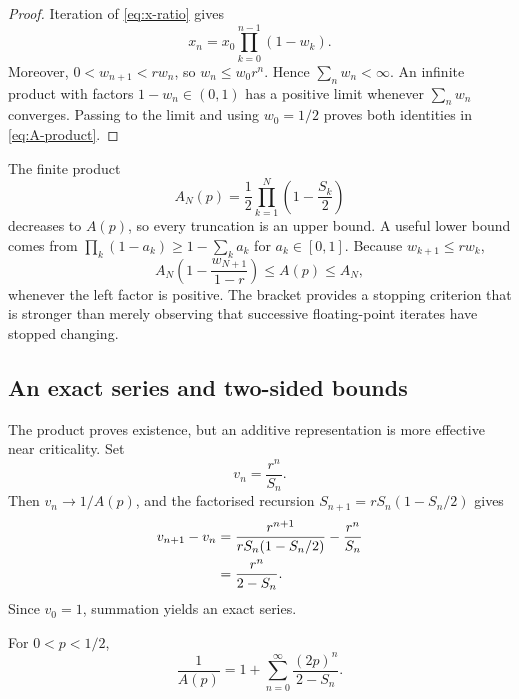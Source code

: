 \begin{proof}
Iteration of \cref{eq:x-ratio} gives
\begin{equation}
  x_n=x_0\prod_{k=0}^{n-1}(1-w_k).
\end{equation}
Moreover, \(0<w_{n+1}<rw_n\), so \(w_n\leq w_0r^n\).  Hence
\(\sum_nw_n<\infty\).  An infinite product with factors \(1-w_n\in(0,1)\) has a
positive limit whenever \(\sum_nw_n\) converges.  Passing to the limit and using
\(w_0=1/2\) proves both identities in \cref{eq:A-product}.
\end{proof}

The finite product
\begin{equation}
  A_N(p)=\frac12\prod_{k=1}^{N}\left(1-\frac{S_k}{2}\right)
  \label{eq:A-partial-product}
\end{equation}
decreases to \(A(p)\), so every truncation is an upper bound.  A useful lower bound
comes from \(\prod_k(1-a_k)\geq1-\sum_ka_k\) for \(a_k\in[0,1]\).  Because
\(w_{k+1}\leq rw_k\),
\begin{equation}
  A_N\left(1-\frac{w_{N+1}}{1-r}\right)
  \leq A(p)\leq A_N,
  \label{eq:A-product-tail-bound}
\end{equation}
whenever the left factor is positive.  The bracket provides a stopping criterion
that is stronger than merely observing that successive floating-point iterates have
stopped changing.

\subsection{An exact series and two-sided bounds}
\label{sec:A-series-bounds}

The product proves existence, but an additive representation is more effective near
criticality.  Set
\begin{equation}
  v_n=\frac{r^n}{S_n}.
\end{equation}
Then \(v_n\to1/A(p)\), and the factorised recursion
\(S_{n+1}=rS_n(1-S_n/2)\) gives
\begin{align}
  v_{n+1}-v_n
  &=\frac{r^{n+1}}{rS_n(1-S_n/2)}-\frac{r^n}{S_n}
    \notag\\
  &=\frac{r^n}{2-S_n}.
  \label{eq:v-increment}
\end{align}
Since \(v_0=1\), summation yields an exact series.

\begin{proposition}
\label{prop:A-series}
For \(0<p<1/2\),
\begin{equation}
  \frac{1}{A(p)}
  =1+\sum_{n=0}^{\infty}\frac{(2p)^n}{2-S_n}.
  \label{eq:A-series}
\end{equation}
\end{proposition}

